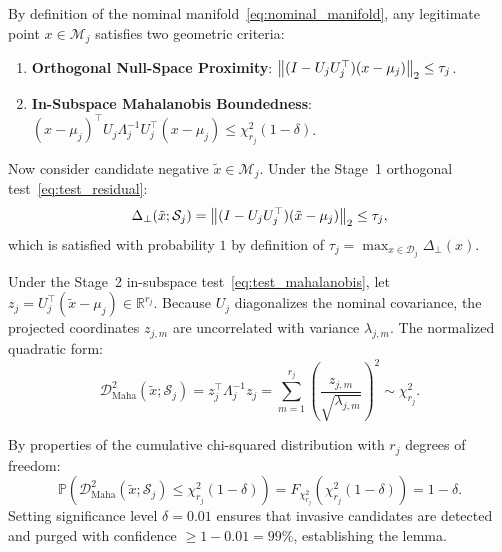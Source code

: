 \begin{IEEEproof}
By definition of the nominal manifold~\eqref{eq:nominal_manifold}, any legitimate point $x \in \mathcal{M}_j$ satisfies two geometric criteria:
\begin{enumerate}
    \item \textbf{Orthogonal Null-Space Proximity}: $\left\lVert(I - U_j U_j^\top)(x - \mu_j)\right\rVert_2 \le \tau_j$.
    \item \textbf{In-Subspace Mahalanobis Boundedness}: $(x - \mu_j)^\top U_j \Lambda_j^{-1} U_j^\top (x - \mu_j) \le \chi^2_{r_j}(1-\delta)$.
\end{enumerate}

Now consider candidate negative $\tilde{x} \in \mathcal{M}_j$. Under the Stage~1 orthogonal test~\eqref{eq:test_residual}:
\begin{equation}
\Delta_{\perp}(\tilde{x}; \mathcal{S}_j) = \left\lVert(I - U_j U_j^\top)(\tilde{x} - \mu_j)\right\rVert_2 \le \tau_j,
\end{equation}
which is satisfied with probability $1$ by definition of $\tau_j = \max_{x \in \mathcal{D}_j} \Delta_{\perp}(x)$.

Under the Stage~2 in-subspace test~\eqref{eq:test_mahalanobis}, let $z_j = U_j^\top (\tilde{x} - \mu_j) \in \mathbb{R}^{r_j}$. Because $U_j$ diagonalizes the nominal covariance, the projected coordinates $z_{j,m}$ are uncorrelated with variance $\lambda_{j,m}$. The normalized quadratic form:
\begin{equation}
\mathcal{D}_{\text{Maha}}^2(\tilde{x}; \mathcal{S}_j) = z_j^\top \Lambda_j^{-1} z_j = \sum_{m=1}^{r_j} \left( \frac{z_{j,m}}{\sqrt{\lambda_{j,m}}} \right)^2 \sim \chi^2_{r_j}.
\end{equation}

By properties of the cumulative chi-squared distribution with $r_j$ degrees of freedom:
\begin{equation}
\mathbb{P}\left( \mathcal{D}_{\text{Maha}}^2(\tilde{x}; \mathcal{S}_j) \le \chi^2_{r_j}(1-\delta) \right) = F_{\chi^2_{r_j}}\left(\chi^2_{r_j}(1-\delta)\right) = 1 - \delta.
\end{equation}
Setting significance level $\delta = 0.01$ ensures that invasive candidates are detected and purged with confidence $\ge 1 - 0.01 = 99\%$, establishing the lemma.
\end{IEEEproof}


